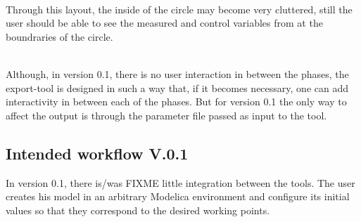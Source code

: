 \documentclass{report}
\begin{document}
\begin{itemize}
\setlength\fboxsep{0pt}
\setlength\fboxrule{0.5pt}
\\\newline
Through this layout, the inside of the circle may become very cluttered, still the user should be able to see the measured and control variables from at the boundraries of the circle.\\\newline\\\newline 
\end{itemize}
Although, in version 0.1, there is no user interaction in between the phases, the export-tool is designed in such a way that, if it becomes necessary, one can add interactivity in between each of the phases. But for version 0.1 the only way to affect the output is through the parameter file passed as input to the tool.


\subsection{Intended workflow V.0.1}
In version 0.1, there is/was FIXME little integration between the tools. The user creates his model in an arbitrary Modelica environment and configure its initial values so that they correspond to the desired working points.
\\\newline
\end{document}
